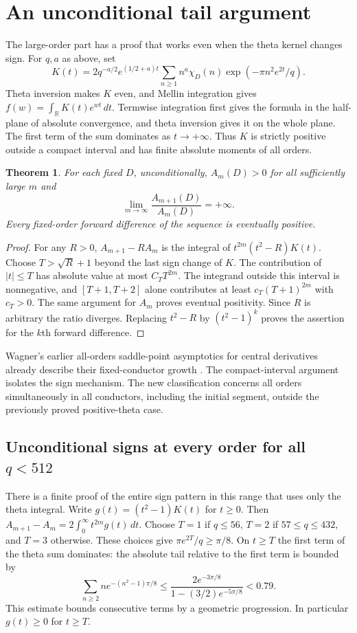 \documentclass[11pt]{article}
\newtheorem{theorem}{Theorem}
\numberwithin{equation}{section}
\begin{document}
\section{An unconditional tail argument}
The large-order part has a proof that works even when the theta kernel changes sign. For $q,a$ as above, set
\[
 K(t)=2q^{-a/2}e^{(1/2+a)t}
       \sum_{n\ge1}n^a\chi_D(n)\exp(-\pi n^2 e^{2t}/q).
\]
Theta inversion makes $K$ even, and Mellin integration gives $f(w)=\int_{\mathbb R} K(t)e^{wt}\,dt$. Termwise integration first gives the formula in the half-plane of absolute convergence, and theta inversion gives it on the whole plane. The first term of the sum dominates as $t\to+\infty$. Thus $K$ is strictly positive outside a compact interval and has finite absolute moments of all orders.
\begin{theorem}\label{th:tail}
For each fixed $D$, unconditionally, $A_m(D)>0$ for all sufficiently large $m$ and
\[
 \lim_{m\to\infty}\frac{A_{m+1}(D)}{A_m(D)}=+\infty .
\]
Every fixed-order forward difference of the sequence is eventually positive.
\end{theorem}
\begin{proof}
For any $R>0$, $A_{m+1}-R A_m$ is the integral of $t^{2m}(t^2-R)K(t)$. Choose $T>\sqrt R+1$ beyond the last sign change of $K$. The contribution of $|t|\le T$ has absolute value at most $C_T T^{2m}$. The integrand outside this interval is nonnegative, and $[T+1,T+2]$ alone contributes at least $c_T(T+1)^{2m}$ with $c_T>0$. The same argument for $A_m$ proves eventual positivity. Since $R$ is arbitrary the ratio diverges. Replacing $t^2-R$ by $(t^2-1)^k$ proves the assertion for the $k$th forward difference.
\end{proof}
Wagner's earlier all-orders saddle-point asymptotics for central derivatives already describe their fixed-conductor growth \cite[Theorem 4.1 and \S4.1.2]{Wagner}. The compact-interval argument isolates the sign mechanism. The new classification concerns all orders simultaneously in all conductors, including the initial segment, outside the previously proved positive-theta case.

\subsection*{Unconditional signs at every order for all $q<512$}
There is a finite proof of the entire sign pattern in this range that uses only the theta integral. Write $g(t)=(t^2-1)K(t)$ for $t\ge0$. Then $A_{m+1}-A_m=2\int_0^\infty t^{2m}g(t)\,dt$. Choose $T=1$ if $q\le56$, $T=2$ if $57\le q\le432$, and $T=3$ otherwise. These choices give $\pi e^{2T}/q\ge\pi/8$. On $t\ge T$ the first term of the theta sum dominates: the absolute tail relative to the first term is bounded by
\[
 \sum_{n\ge2} n e^{-(n^2-1)\pi/8}
 \le\frac{2e^{-3\pi/8}}{1-(3/2)e^{-5\pi/8}}<0.79.
\]
This estimate bounds consecutive terms by a geometric progression. In particular $g(t)\ge0$ for $t\ge T$.
\end{document}
